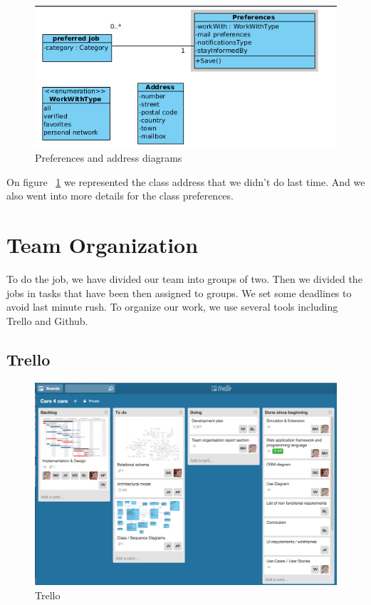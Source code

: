 \documentclass[11pt, a4paper]{article}   	%
\begin{document}
\begin{figure}[!ht]
 \includegraphics[width=\textwidth]{preferences.png}
   \caption{\label{preferences} Preferences and address diagrams}
\end{figure}

On figure ~\ref{preferences} we represented the class address that we didn't do last time. And we also went into more details
for the class preferences.



\section{Team Organization}

To do the job, we have divided our team into groups of two.
Then we divided the jobs in tasks that have been then assigned to groups.
We set some deadlines to avoid last minute rush.
To organize our work, we use several tools including Trello and Github. 

\subsection{Trello}

\begin{figure}[!ht]
   \includegraphics[width=\textwidth]{trello.png}
   \caption{\label{trello} Trello}
\end{figure}
\end{document}
